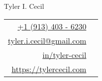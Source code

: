 \documentclass[11pt,a4paper,sans]{article}
\newcommand{\cvcolor}[1]{{\color{MidnightBlue}#1}}
\begin{document}
\noindent
\begin{minipage}{0.675\linewidth}
  \vspace{1em}
  {
    \fontsize{45pt}{50pt}\selectfont
    \noindent
    Tyler I. Cecil
  }\
\end{minipage}
\hfill
{
  \fontsize{10pt}{13pt}\selectfont
  \begin{tabular}{rl}
    \href{tel:+1 (913) 403 - 6230}{+1 (913) 403 - 6230}&\cvcolor{\faPhone} \\
    \href{mailto:tyler.i.cecil@gmail.com}{tyler.i.cecil@gmail.com}&\cvcolor{\faEnvelope} \\
    \href{https://www.linkedin.com/in/tyler-cecil/}{in/tyler-cecil}&\cvcolor{\faLinkedinSquare} \\
    \href{https://tylercecil.com}{https://tylercecil.com}&\cvcolor{\faGlobe} \\
  \end{tabular}
  }

\vspace{0.25em}
\noindent\hrulefill
\end{document}
